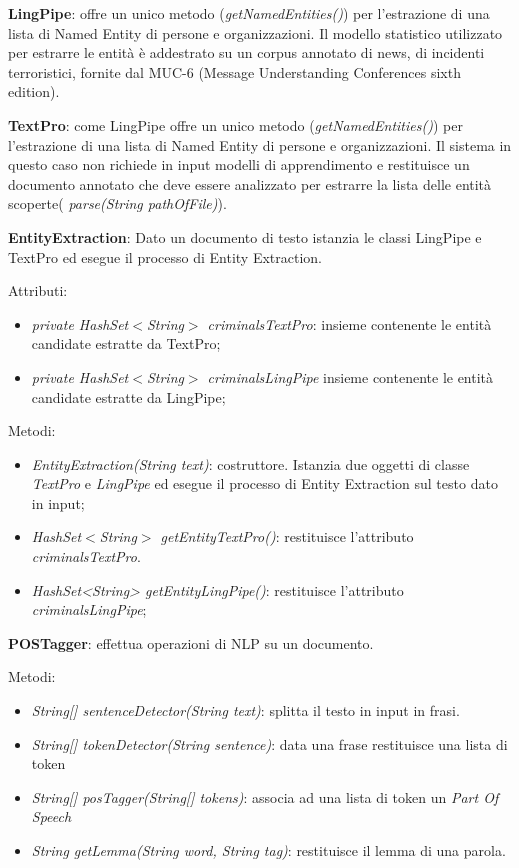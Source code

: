 \textbf{LingPipe}: offre un unico metodo (\textit{getNamedEntities()}) per l'estrazione di una lista di Named Entity di persone e organizzazioni. Il modello statistico utilizzato per estrarre le entità è  addestrato su un corpus annotato di news, di incidenti terroristici, fornite dal MUC-6 (Message Understanding Conferences sixth edition).

{\bf TextPro}: come LingPipe offre un unico metodo (\textit{getNamedEntities()}) per l'estrazione di una lista di Named Entity di persone e organizzazioni. Il sistema in questo caso non richiede in input modelli di apprendimento e restituisce un documento annotato che deve essere analizzato per estrarre la lista delle entità scoperte( \textit{parse(String pathOfFile)}).

{\bf EntityExtraction}: Dato un documento di testo istanzia le classi LingPipe e TextPro ed esegue il processo di Entity Extraction.

Attributi:
\begin{itemize}
	\item \textit{private HashSet$<$String$>$ criminalsTextPro}: insieme contenente le entità candidate estratte da TextPro;
	\item \textit{private HashSet$<$String$>$ criminalsLingPipe} insieme contenente le entità candidate estratte da LingPipe;
\end{itemize}
Metodi:
\begin{itemize}
	\item \textit{EntityExtraction(String text)}: costruttore. Istanzia due oggetti di classe \textit{TextPro} e \textit{LingPipe} ed esegue il processo di Entity Extraction sul testo dato in input;
	\item \textit{HashSet$<$String$>$ getEntityTextPro()}: restituisce l'attributo \textit{criminalsTextPro}.
	\item \textit{HashSet<String> getEntityLingPipe()}: restituisce l'attributo \textit{criminalsLingPipe}; 
\end{itemize}

{\bf POSTagger}: effettua operazioni di NLP su un documento.

Metodi:
\begin{itemize}
	\item \textit{String[] sentenceDetector(String text)}: splitta il testo in input in frasi.
	\item \textit{String[] tokenDetector(String sentence)}: data una frase restituisce una lista di token
	\item \textit{String[] posTagger(String[] tokens)}: associa ad una lista di token un \textit{Part Of Speech}
	\item \textit{String getLemma(String word, String tag)}: restituisce il lemma di una parola.
\end{itemize}

